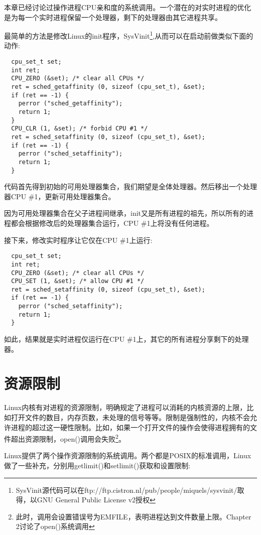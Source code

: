   本章已经讨论过操作进程CPU亲和度的系统调用。一个潜在的对实时进程的优化是为每一个实时进程保留一个处理器，剩下的处理器由其它进程共享。

  最简单的方法是修改Linux的init程序，SysVinit\footnote[1]{SysVinit源代码可以在ftp://ftp.cistron.nl/pub/people/miquels/sysvinit/取得，以GNU General Public License v2授权},从而可以在启动前做类似下面的动作:

\begin{lstlisting}
  cpu_set_t set;
  int ret;
  CPU_ZERO (&set); /* clear all CPUs */
  ret = sched_getaffinity (0, sizeof (cpu_set_t), &set);
  if (ret == -1) {
    perror ("sched_getaffinity");
    return 1;
  }
  CPU_CLR (1, &set); /* forbid CPU #1 */
  ret = sched_setaffinity (0, sizeof (cpu_set_t), &set);
  if (ret == -1) {
    perror ("sched_setaffinity");
    return 1;
  }
\end{lstlisting}

  代码首先得到初始的可用处理器集合，我们期望是全体处理器。然后移出一个处理器CPU \#1，更新可用处理器集合。

  因为可用处理器集合在父子进程间继承，init又是所有进程的祖先，所以所有的进程都会根据修改后的处理器集合运行，CPU \#1上将没有任何进程。

  接下来，修改实时程序让它仅在CPU \#1上运行:

\begin{lstlisting}
  cpu_set_t set;
  int ret;
  CPU_ZERO (&set); /* clear all CPUs */
  CPU_SET (1, &set); /* allow CPU #1 */
  ret = sched_setaffinity (0, sizeof (cpu_set_t), &set);
  if (ret == -1) {
    perror ("sched_setaffinity");
    return 1;
  }
\end{lstlisting}

  如此，结果就是实时进程仅运行在CPU \#1上，其它的所有进程分享剩下的处理器。

\section{资源限制}

  Linux内核有对进程的资源限制，明确规定了进程可以消耗的内核资源的上限，比如打开文件的数目，内存页数，未处理的信号等等。限制是强制性的，内核不会允许进程的超过这一硬性限制。比如，如果一个打开文件的操作会使得进程拥有的文件超出资源限制，open()调用会失败\footnote[2]{此时，调用会设置错误号为EMFILE，表明进程达到文件数量上限。Chapter 2讨论了open()系统调用}。

  Linux提供了两个操作资源限制的系统调用。两个都是POSIX的标准调用，Linux做了一些补充，分别用getlimit()和setlimit()获取和设置限制:

